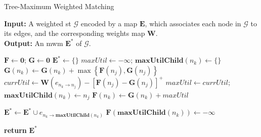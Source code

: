 \begin{algorithm}[tbp!]
\footnotesize
    \caption{Tree-Maximum Weighted Matching}
    \label{Alg:tmwm}
    \hspace*{\algorithmicindent} \textbf{Input:} A weighted \gls{st} $\mathcal{G}$ encoded by a map $\mathbf{E}$, which associates each node in $\mathcal{G}$ to its edges, and the corresponding weights map $\mathbf{W}$. \\ 
    \hspace*{\algorithmicindent} \textbf{Output:} An \gls{mwm} $\mathbf{E^*}$ of $\mathcal{G}$. 
    \begin{algorithmic}[1] %
            \State $\mathbf{F} \gets \mathbf{0}$; $\mathbf{G} \gets \mathbf{0}$ 
            \State $\mathbf{E^*} \gets \{ \}$ 
             
            \State $maxUtil \gets - \infty$;  $\mathbf{maxUtilChild}(n_k) \gets \{ \}$
             
                \State $\mathbf{G}(n_k) \gets \mathbf{G}(n_k) + \max \left\{ \mathbf{F}(n_j), \mathbf{G}(n_j) \right\}$
                \State $currUtil \gets \mathbf{W} ( e_{n_k \to n_j} ) - \left[ \mathbf{F}(n_j) - \mathbf{G}(n_j) \right]^+  $
            	\State $maxUtil \gets currUtil$;  $\mathbf{maxUtilChild}(n_k) \gets n_j$ 
            \EndIf
            \EndFor\label{edgesFor}
            \State $\mathbf{F}(n_k) \gets \mathbf{G}(n_k) + maxUtil$ 
            \EndFor\label{nodesFor}
			
			 			
			
					\State $\mathbf{E^*} \gets \mathbf{E^*} \cup e_{n_k \to \mathbf{maxUtilChild}(n_k)}$
					\State $\mathbf{F}(\mathbf{maxUtilChild}(n_k)) \gets -\infty$ 
				\EndIf\label{activeIf}
			\EndFor\label{edgesFor2}            
            
            \State \textbf{return} $\mathbf{E^*}$
        \EndProcedure
    \end{algorithmic}
\end{algorithm}


